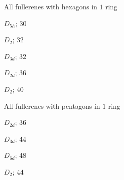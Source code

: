 \documentclass[%
pdf,
colorBG,
slideColor,
]{prosper}
\begin{document}
\begin{slide}{All fullerenes with hexagons in $1$ ring}

\begin{center}
\begin{minipage}[b]{3.5cm}
\centering
{}\par
$D_{5h}$; 30
\end{minipage}
\begin{minipage}[b]{3.5cm}
\centering
{}\par
$D_2$; 32
\end{minipage}
\begin{minipage}[b]{3.5cm}
\centering
{}\par
$D_{3d}$; 32
\end{minipage}
\begin{minipage}[b]{3.5cm}
\centering
{}\par
$D_{2d}$; 36
\end{minipage}
\begin{minipage}[b]{3.5cm}
\centering
{}\par
$D_2$; 40
\end{minipage}
\end{center}
\end{slide}


\begin{slide}{All fullerenes with pentagons in $1$ ring}

\begin{center}
\begin{minipage}{5cm}
\centering
{}\par
$D_{2d}$; 36
\end{minipage}
\begin{minipage}{5cm}
\centering
{}\par
$D_{3d}$; 44
\end{minipage}
\begin{minipage}{5cm}
\centering
{}\par
$D_{6d}$; 48
\end{minipage}
\begin{minipage}{5cm}
\centering
{}\par
$D_2$; 44
\end{minipage}
\end{center}
\end{slide}
\end{document}
